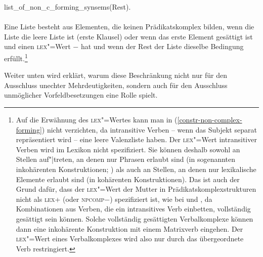 \hfill        list\_of\_non\_c\_forming\_synsems(Rest).\\\\
\zs
Eine Liste besteht aus Elementen, die keinen Prädikatskomplex bilden, wenn die Liste
die leere Liste ist (erste Klausel) oder wenn das erste Element gesättigt ist
und einen \textsc{lex}"=Wert $-$ 
hat und wenn der Rest der Liste dieselbe Bedingung erfüllt.\footnote{\label{fn-lex-intransitiv}%
        Auf die Erwähnung des \textsc{lex}"=Wertes kann man in (\ref{constr-non-complex-forming}) nicht verzichten,
        da intransitive Verben -- wenn das Subjekt separat repräsentiert wird -- eine
        leere Valenzliste haben. Der \textsc{lex}"=Wert intransitiver Verben wird
        im Lexikon nicht spezifiziert. Sie können deshalb sowohl an Stellen auf"|treten,
        an denen nur Phrasen erlaubt sind (in sogenannten inkohärenten Konstruktionen; \citealp{Bech55a})
        als auch an Stellen, an denen nur lexikalische Elemente erlaubt sind (in kohärenten Konstruktionen).
        Das ist auch der Grund dafür, dass der \textsc{lex}"=Wert der Mutter in
        Prädikatskomplexstrukturen nicht als \textsc{lex}+ (oder \textsc{npcomp}$-$) spezifiziert
        ist, wie \zb bei \citet[23]{HN94a} und \citet[177]{dKM2001a}, da Kombinationen aus Verben, die ein intransitives Verb einbetten,
        vollständig gesättigt sein können. Solche vollständig gesättigten Verbalkomplexe können dann eine
        inkohärente Konstruktion mit einem Matrixverb eingehen. Der \textsc{lex}"=Wert eines Verbalkomplexes
        wird also nur durch das übergeordnete Verb restringiert.%
}

Weiter unten wird erklärt, warum diese Beschränkung nicht nur für den Ausschluss
unechter Mehrdeutigkeiten, sondern auch für den Ausschluss unmöglicher Vorfeldbesetzungen
eine Rolle spielt.


